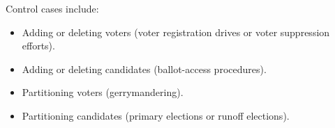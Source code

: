 \documentclass[a0paper,portrait]{baposter}
\begin{document}
\begin{poster}
{Control cases include:
\begin{itemize}
\itemsep0em
\item Adding or deleting voters (voter registration drives or voter suppression efforts).
\item Adding or deleting candidates (ballot-access procedures).
\item Partitioning voters (gerrymandering). 
\item Partitioning candidates (primary elections or runoff elections). 
\end{itemize}

}

{

  \centering

}
\end{poster}
\end{document}
